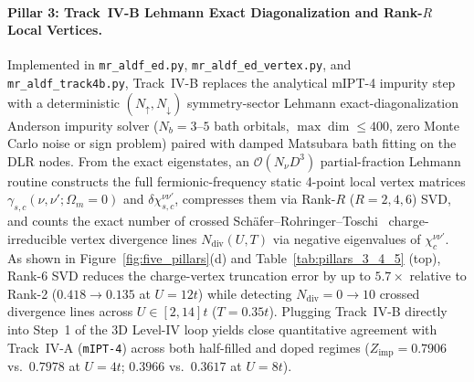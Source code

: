 \documentclass[11pt,a4paper]{article}
\numberwithin{equation}{section}
\theoremstyle{plain}
\theoremstyle{definition}
\begin{document}
\paragraph{Pillar 3: Track~IV-B Lehmann Exact Diagonalization and Rank-$R$ Local Vertices.}
Implemented in \texttt{mr\_aldf\_ed.py}, \texttt{mr\_aldf\_ed\_vertex.py}, and \texttt{mr\_aldf\_track4b.py}, Track~IV-B replaces the analytical mIPT-4 impurity step with a deterministic $(N_\uparrow, N_\downarrow)$ symmetry-sector Lehmann exact-diagonalization Anderson impurity solver ($N_b = 3$--$5$ bath orbitals, $\max\dim \le 400$, zero Monte Carlo noise or sign problem) paired with damped Matsubara bath fitting on the DLR nodes. From the exact eigenstates, an $\mathcal{O}(N_\nu D^3)$ partial-fraction Lehmann routine constructs the full fermionic-frequency static 4-point local vertex matrices $\gamma_{s,c}(\nu,\nu'; \Omega_m = 0)$ and $\delta\chi_{s,c}^{\nu\nu'}$, compresses them via Rank-$R$ ($R = 2, 4, 6$) SVD, and counts the exact number of crossed Sch\"afer--Rohringer--Toschi~\cite{Schaefer2013,Gunnarsson2017} charge-irreducible vertex divergence lines $N_{\mathrm{div}}(U,T)$ via negative eigenvalues of $\chi_c^{\nu\nu'}$. As shown in Figure~\ref{fig:five_pillars}(d) and Table~\ref{tab:pillars_3_4_5} (top), Rank-6 SVD reduces the charge-vertex truncation error by up to $5.7\times$ relative to Rank-2 ($0.418 \to 0.135$ at $U = 12t$) while detecting $N_{\mathrm{div}} = 0 \to 10$ crossed divergence lines across $U \in [2, 14]t$ ($T = 0.35t$). Plugging Track~IV-B directly into Step~1 of the 3D Level-IV loop yields close quantitative agreement with Track~IV-A (\texttt{mIPT-4}) across both half-filled and doped regimes ($Z_{\mathrm{imp}} = 0.7906$ vs.\ $0.7978$ at $U = 4t$; $0.3966$ vs.\ $0.3617$ at $U = 8t$).
\end{document}
